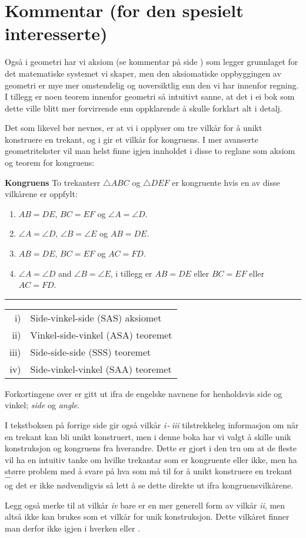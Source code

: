 



\section*{Kommentar (for den spesielt interesserte)}
Også i geometri har vi aksiom (se kommentar på side \pageref{Kommentar1}) som legger grunnlaget for det matematiske systemet vi skaper, men den aksiomatiske oppbyggingen av geometri er mye mer omstendelig og uoversiktlig enn den vi har innenfor regning. I tillegg er noen teorem innenfor geometri så intuitivt sanne, at det i ei bok som dette ville blitt mer forvirrende enn oppklarende å skulle forklart alt i detalj.\vsk

Det som likevel bør nevnes, er at vi i  opplyser om tre vilkår for å unikt konstruere en trekant, og i  gir et vilkår for kongruens. I mer avanserte geometritekster vil man helst finne igjen innholdet i disse to reglane som aksiom og teorem for kongruens: \regv

\begin{tcolorbox}[boxrule=0.3 mm,arc=0mm,colback=blue!5] {\large \textbf{Kongruens} \vspace{5 pt}}\newline
	To trekanterr $ \triangle ABC $ og $ \triangle DEF $ er kongruente hvis en av disse vilkårene er oppfylt:
	\begin{enumerate}[label=\roman*)]
		\item $ AB=DE $, $ BC=EF $ og $ \angle A=\angle D $.
		\item $ \angle A=\angle D $, $ \angle B=\angle E $ og $ AB=DE $.
		\item $ AB=DE $, $ BC=EF $ og $ AC=FD $.
		\item $ {\angle A=\angle D} $ and $ {\angle B=\angle E} $, i tillegg er $ {AB=DE} $ eller $ BC=EF $ eller $ AC=FD $.
	\end{enumerate}
\rule{1\linewidth}{0.75bp}
\begin{center}
	\begin{tabular}{rl}
		i) &Side-vinkel-side (SAS) aksiomet\\
		ii) &Vinkel-side-vinkel (ASA) teoremet\\
		iii) & Side-side-side (SSS) teoremet \\
		iv) & Side-vinkel-vinkel (SAA) teoremet 
	\end{tabular}
\end{center}
\mer Forkortingene over er gitt ut ifra de engelske navnene for henholdsvis side og vinkel; \textit{side} og \textit{angle}.
\end{tcolorbox}
\newpage
I tekstboksen på forrige side gir også vilkår \textsl{i}\,-\,\textsl{iii} tilstrekkeleg informasjon om når en trekant kan bli unikt konstruert, men i denne boka har vi valgt å skille unik konstruksjon og kongruens fra hverandre. Dette er gjort i den tru om at de fleste vil ha en intuitiv tanke om hvilke trekantar som er kongruente eller ikke, men ha større problem med å svare på hva som må til for å unikt konstruere en trekant $ - $ \\og det er ikke nødvendigvis så lett å se dette direkte ut ifra kongruensvilkårene.\vsk

Legg også merke til at vilkår \textsl{iv} bare er en mer generell form av vilkår \textsl{ii}, men altså ikke kan brukes som et vilkår for unik konstruksjon. Dette vilkåret finner man derfor ikke igjen i hverken  eller .



